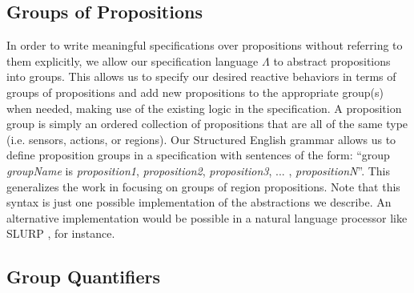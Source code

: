 \subsection{Groups of Propositions} 

In order to write meaningful specifications over propositions without referring to them explicitly, we allow our specification language $\Lambda$ to abstract propositions into groups. 
This allows us to specify our desired reactive behaviors in terms of groups of propositions and add new propositions to the appropriate group(s) when needed, making use of the existing logic in the specification. 
A proposition group is simply an ordered collection of propositions that are all of the same type (i.e. sensors, actions, or regions). 
Our Structured English grammar allows us to define proposition groups in a specification with sentences of the form: 
``group \textit{groupName} is \textit{proposition1}, \textit{proposition2}, \textit{proposition3}, ... , \textit{propositionN}''. 
This generalizes the work in \cite{BingxinRSS2012} focusing on groups of region propositions. 
Note that this syntax is just one possible implementation of the abstractions we describe. 
An alternative implementation would be possible in a natural language processor like SLURP \cite{RamanRSS2013}, for instance. 

\subsection{Group Quantifiers} 

